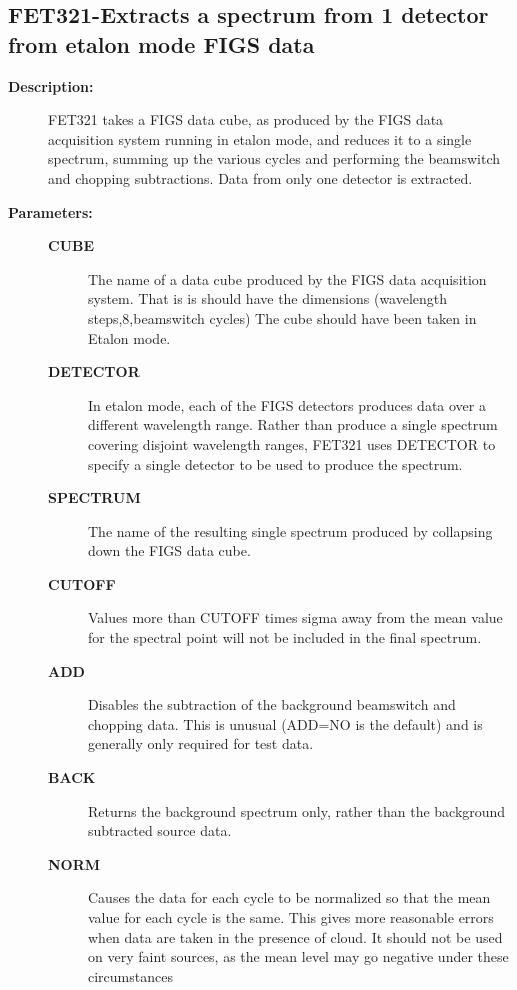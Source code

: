 \subsection{FET321-\label{FET321}Extracts a spectrum from 1 detector from etalon mode FIGS data}
\begin{description}

\item [{\bf Description:}]
 FET321 takes a FIGS data cube, as produced by the FIGS data
 acquisition system running in etalon mode, and reduces it to a
 single spectrum, summing up the various cycles and performing the
 beamswitch and chopping subtractions.  Data from only one detector
 is extracted.

\item [{\bf Parameters:}]
\begin{description}
\item [{\bf CUBE}]
 The name of a data cube produced by the FIGS data
 acquisition system.  That is is should have the
 dimensions (wavelength steps,8,beamswitch cycles)
 The cube should have been taken in Etalon mode.
\item [{\bf DETECTOR}]
 In etalon mode, each of the FIGS detectors produces
 data over a different wavelength range.  Rather than
 produce a single spectrum covering disjoint wavelength
 ranges, FET321 uses DETECTOR to specify a single detector
 to be used to produce the spectrum.
\item [{\bf SPECTRUM}]
 The name of the resulting single spectrum
 produced by collapsing down the FIGS data cube.
\item [{\bf CUTOFF}]
 Values more than CUTOFF times sigma away from the mean
 value for the spectral point will not be included in
 the final spectrum.
\item [{\bf ADD}]
 Disables the subtraction of the background beamswitch
 and chopping data.  This is unusual (ADD=NO is the
 default) and is generally only required for test data.
\item [{\bf BACK}]
 Returns the background spectrum only, rather than the
 background subtracted source data.
\item [{\bf NORM}]
 Causes the data for each cycle to be normalized so that
 the mean value for each cycle is the same. This gives more
 reasonable errors when data are taken in the presence of
 cloud. It should not be used on very faint sources, as the
 mean level may go negative under these circumstances
\end{description}


\end{description}
